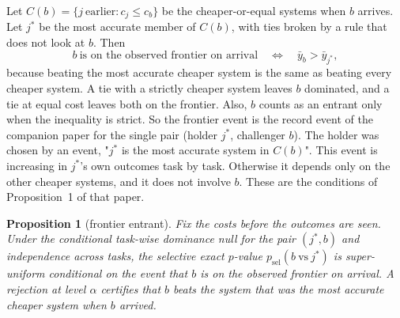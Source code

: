 \documentclass[11pt]{article}
\newtheorem{proposition}{Proposition}
\begin{document}
Let $C(b)=\{j\ \text{earlier}: c_j\le c_b\}$ be the cheaper-or-equal systems when $b$ arrives. Let $j^*$ be the most accurate member of $C(b)$, with ties broken by a rule that does not look at $b$. Then
\[
b\ \text{is on the observed frontier on arrival}\quad\Longleftrightarrow\quad \bar y_b>\bar y_{j^*},
\]
because beating the most accurate cheaper system is the same as beating every cheaper system. A tie with a strictly cheaper system leaves $b$ dominated, and a tie at equal cost leaves both on the frontier. Also, $b$ counts as an entrant only when the inequality is strict. So the frontier event is the record event of the companion paper for the single pair (holder $j^*$, challenger $b$). The holder was chosen by an event, "$j^*$ is the most accurate system in $C(b)$". This event is increasing in $j^*$'s own outcomes task by task. Otherwise it depends only on the other cheaper systems, and it does not involve $b$. These are the conditions of Proposition~1 of that paper.

\begin{proposition}[frontier entrant]
\label{prop:entrant}
Fix the costs before the outcomes are seen. Under the conditional task-wise dominance null for the pair $(j^*,b)$ and independence across tasks, the selective exact $p$-value $p_{\mathrm{sel}}(b\ \text{vs}\ j^*)$ is super-uniform conditional on the event that $b$ is on the observed frontier on arrival. A rejection at level $\alpha$ certifies that $b$ beats the system that was the most accurate cheaper system when $b$ arrived.
\end{proposition}
\end{document}
